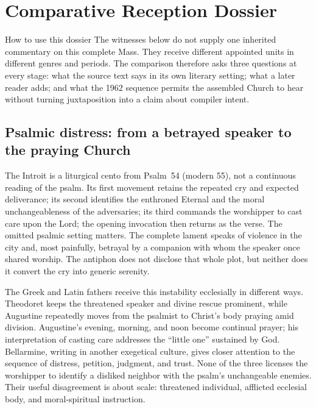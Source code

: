 \section*{Comparative Reception Dossier}

\begin{massbox}{How to use this dossier}
The witnesses below do not supply one inherited commentary on this complete
Mass. They receive different appointed units in different genres and periods.
The comparison therefore asks three questions at every stage: what the source
text says in its own literary setting; what a later reader adds; and what the
1962 sequence permits the assembled Church to hear without turning juxtaposition
into a claim about compiler intent.
\end{massbox}

\subsection*{Psalmic distress: from a betrayed speaker to the praying Church\enspace{}}

The Introit is a liturgical cento from Psalm~54 (modern 55), not a continuous
reading of the psalm. Its first movement retains the repeated cry and expected
deliverance; its second identifies the enthroned Eternal and the moral
unchangeableness of the adversaries; its third commands the worshipper to cast
care upon the Lord; the opening invocation then returns as the verse. The
omitted psalmic setting matters. The complete lament speaks of violence in the
city and, most painfully, betrayal by a companion with whom the speaker once
shared worship. The antiphon does not disclose that whole plot, but neither
does it convert the cry into generic serenity.

The Greek and Latin fathers receive this instability ecclesially in different
ways. Theodoret keeps the threatened speaker and divine rescue prominent,
while Augustine repeatedly moves from the psalmist to Christ's body praying
amid division. Augustine's evening, morning, and noon become continual prayer;
his interpretation of casting care addresses the ``little one'' sustained by
God. Bellarmine, writing in another exegetical culture, gives closer attention
to the sequence of distress, petition, judgment, and trust. None of the three
licenses the worshipper to identify a disliked neighbor with the psalm's
unchangeable enemies. Their useful disagreement is about scale: threatened
individual, afflicted ecclesial body, and moral-spiritual instruction.

